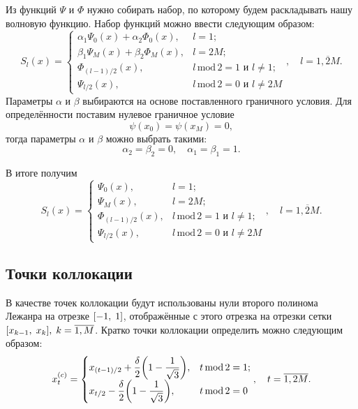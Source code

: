 \documentclass[10pt]{article}
\begin{document}
Из функций $\Psi$ и $\Phi$ нужно собирать набор, по которому будем раскладывать нашу волновую функцию. Набор функций можно ввести следующим образом:
\begin{equation}
    S_l(x) =
    \begin{cases}
        \alpha_1 \Psi_0(x) + \alpha_2 \Phi_0(x), &l=1;\\
        \beta_1 \Psi_M(x) + \beta_2 \Phi_M(x), &l=2M;\\
         \Phi_{(l-1)/2}(x), &{l\,\textrm{mod}\,2 = 1\textrm{ и }l\ne 1};\\
        \Psi_{l/2}(x), &{l\,\textrm{mod}\,2 = 0\textrm{ и }l\ne 2M}
    \end{cases}
    ,\quad l = \overline{1, 2M}.
\end{equation}
Параметры $\alpha$ и $\beta$ выбираются на основе поставленного граничного условия. Для определённости поставим нулевое граничное условие
\begin{equation}
    \psi(x_0) = \psi(x_M) = 0,
\end{equation}
тогда параметры $\alpha$ и $\beta$ можно выбрать такими:
\begin{equation}
    \alpha_2=\beta_2=0,\quad \alpha_1=\beta_1=1.
\end{equation}

В итоге получим
\begin{equation}
    S_l(x) =
    \begin{cases}
        \Psi_0(x), &l=1;\\
        \Psi_M(x), &l=2M;\\
         \Phi_{(l-1)/2}(x), &{l\,\textrm{mod}\,2 = 1\textrm{ и }l\ne 1};\\
        \Psi_{l/2}(x), &{l\,\textrm{mod}\,2 = 0\textrm{ и }l\ne 2M}
    \end{cases}
    ,\quad l = \overline{1, 2M}.
\end{equation}

\subsection{Точки коллокации}

В качестве точек коллокации будут использованы нули второго полинома Лежанра на отрезке $\qty[-1,\;1]$, отображённые с этого отрезка на отрезки сетки $\qty[x_{k-1},\;x_{k}],\; k=\overline{1,M}$. Кратко точки коллокации определить можно следующим образом:
\begin{equation}
    x^{(c)}_t =
    \begin{cases}
        x_{(t-1)/2} + \dfrac{\delta}{2} \qty(1 - \dfrac{1}{\sqrt{3}}), &{t\,\textrm{mod}\,2 = 1};\\
        x_{t/2} - \dfrac{\delta}{2} \qty(1 - \dfrac{1}{\sqrt{3}}), &{t\,\textrm{mod}\,2 = 0}
    \end{cases}
    ,\quad t = \overline{1, 2M}.
\end{equation}
\end{document}
